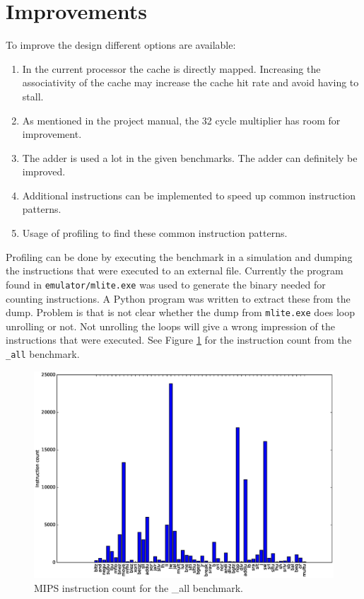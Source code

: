 \documentclass[final]{article}
\begin{document}
\section{Improvements}
\label{sec:improvements}

To improve the design different options are available:

\begin{enumerate}
\item In the current processor the cache is directly mapped. Increasing the associativity of the cache may increase the cache hit rate and avoid having to stall.
\item As mentioned in the project manual, the 32 cycle multiplier has room for improvement.
\item The adder is used a lot in the given benchmarks. The adder can definitely be improved.
\item Additional instructions can be implemented to speed up common instruction patterns.
\item Usage of profiling to find these common instruction patterns.
\end{enumerate}

Profiling can be done by executing the benchmark in a simulation and dumping the instructions that were executed to an external file. Currently the program found in \texttt{emulator/mlite.exe} was used to generate the binary needed for counting instructions. A Python program was written to extract these from the dump. Problem is that is not clear whether the dump from \texttt{mlite.exe} does loop unrolling or not. Not unrolling the loops will give a wrong impression of the instructions that were executed. See Figure \ref{fig:instruction-count} for the instruction count from the \texttt{\_all} benchmark.

\begin{figure}[H]
\centering
\centerline{\includegraphics[width=1.2\textwidth]{resources/bar-chart.eps}}
\caption{MIPS instruction count for the \_all benchmark.}
\label{fig:instruction-count}
\end{figure}
\end{document}
